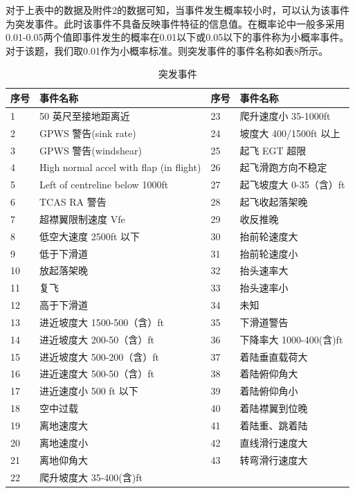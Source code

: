 \documentclass[UTF8]{ctexart}
\begin{document}
对于上表中的数据及附件2的数据可知，当事件发生概率较小时，可以认为该事件为突发事件。此时该事件不具备反映事件特征的信息值。在概率论中一般多采用0.01-0.05两个值即事件发生的概率在0.01以下或0.05以下的事件称为小概率事件。对于该题，我们取0.01作为小概率标准。则突发事件的事件名称如表8所示。 \par
\begin{table}[!ht]
	\centering
	\caption{突发事件}
	\begin{tabular}{|l|l|l|l|}
		\hline
		序号 & 事件名称 & 序号 & 事件名称 \\ \hline
		1 & 50 英尺至接地距离近 & 23 & 爬升速度小 35-1000ft \\ 
		2 & GPWS 警告(sink rate) & 24 & 坡度大 400/1500ft 以上 \\ 
		3 & GPWS 警告(windshear) & 25 & 起飞 EGT 超限 \\ 
		4 & High normal accel with flap (in flight) & 26 & 起飞滑跑方向不稳定 \\ 
		5 & Left of centreline below 1000ft & 27 & 起飞坡度大 0-35（含）ft \\ 
		6 & TCAS RA 警告 & 28 & 起飞收起落架晚 \\ 
		7 & 超襟翼限制速度 Vfe & 29 & 收反推晚 \\ 
		8 & 低空大速度 2500ft 以下 & 30 & 抬前轮速度大 \\ 
		9 & 低于下滑道 & 31 & 抬前轮速度小 \\ 
		10 & 放起落架晚 & 32 & 抬头速率大 \\ 
		11 & 复飞 & 33 & 抬头速率小 \\ 
		12 & 高于下滑道 & 34 & 未知 \\ 
		13 & 进近坡度大 1500-500（含）ft & 35 & 下滑道警告 \\ 
		14 & 进近坡度大 200-50（含）ft & 36 & 下降率大 1000-400(含)ft \\ 
		15 & 进近坡度大 500-200（含）ft & 37 & 着陆垂直载荷大 \\ 
		16 & 进近速度大 500-50（含）ft & 38 & 着陆俯仰角大 \\ 
		17 & 进近速度小 500 ft 以下 & 39 & 着陆俯仰角小 \\ 
		18 & 空中过载 & 40 & 着陆襟翼到位晚 \\ 
		19 & 离地速度大 & 41 & 着陆重、跳着陆 \\ 
		20 & 离地速度小 & 42 & 直线滑行速度大 \\ 
		21 & 离地仰角大 & 43 & 转弯滑行速度大 \\ 
		22 & 爬升坡度大 35-400(含)ft & & \\ \hline
	\end{tabular}
\end{table}\par
\end{document}
